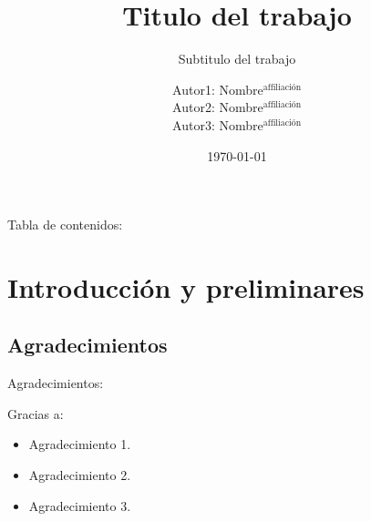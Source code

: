 \documentclass[
  aspectratio=169,
]{beamer}
\begin{document}
	\begin{small}

\title[Programa de posgrado]{Titulo del trabajo  }
\subtitle[Curso]{Subtitulo del trabajo}
\author[Autor abrev.]{
	Autor1: Nombre$^\text{affiliación}$  
	\\Autor2: Nombre$^\text{affiliación}$   
	\\Autor3: Nombre$^\text{affiliación}$  
 }
\date{\today}

\begin{frame}[plain]
	\maketitle
\end{frame}
\begin{frame}{Tabla de contenidos:}
	\tableofcontents
\end{frame}
\section[Introducción y preliminares]{Introducción y preliminares}
\subsection[Agradecimientos]{Agradecimientos}
\begin{frame}{Agradecimientos:}{}
	\begin{block}{Gracias a:}
	\begin{itemize}
		\item Agradecimiento 1.
		\pause
		\item Agradecimiento 2.
		\pause
		\item Agradecimiento 3.  
	\end{itemize}
	\end{block}
\end{frame}

\end{small}
\end{document}

